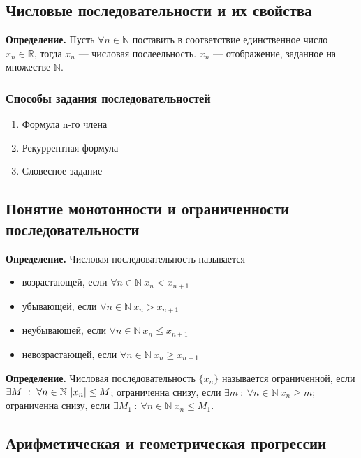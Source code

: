 \documentclass{article}
\begin{document}
    \subsection{Числовые последовательности и их свойства}
    
    \textbf{Определение.} Пусть \(\forall n \in \mathbb{N}\) поставить в соответствие единственное число \(x_n \in \mathbb{R}\), тогда \(x_n\) --- числовая послеельность. \(x_n\) --- отображение, заданное на множестве \(\mathbb{N}\).
    
    \subsubsection{Способы задания последовательностей}
    
    \begin{enumerate}
    	\item Формула n-го члена
        \item Рекуррентная формула
        \item Словесное задание
    \end{enumerate}
    
    \subsection{Понятие монотонности и ограниченности последовательности}
    
    \textbf{Определение.} Числовая последовательность называется
    \begin{itemize}
    	\item возрастающей, если \(\forall n \in \mathbb{N}\ x_n < x_{n+1}\)
        \item убывающей, если \(\forall n \in \mathbb{N}\ x_n > x_{n+1}\)
        \item неубывающей, если \(\forall n \in \mathbb{N}\ x_n \leq x_{n+1}\)
        \item невозрастающей, если \(\forall n \in \mathbb{N}\ x_n \geq x_{n+1}\)
  	\end{itemize}
    
    \textbf{Определение.} Числовая последовательность \(\{x_n\}\) называется ограниченной, если \(\exists M\ :\ \forall n \in \mathbb{N}\ \abs{x_n} \leq M\); ограниченна снизу, если \(\exists m\ :\ \forall n \in \mathbb{N}\ x_n \geq m\); ограниченна снизу, если \(\exists M_1\ :\ \forall n \in \mathbb{N}\ x_n \leq M_1\).
    
    \subsection{Арифметическая и геометрическая прогрессии}
    
\end{document}
